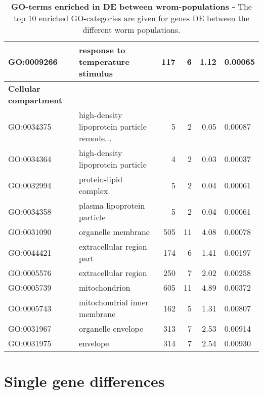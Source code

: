\begin{table}[ht]
\begin{center}
\begin{tabular}{llrrrl}
  GO:0009266 & response to temperature stimulus & 117 &   6 & 1.12 & 0.00065 \\ 
  \hline
  \textbf{Cellular compartment} &  &   &   &  &  \\  
  GO:0034375 & high-density lipoprotein particle remode... &   5 &   2 & 0.05 & 0.00087 \\ 
  GO:0034364 & high-density lipoprotein particle &   4 &   2 & 0.03 & 0.00037 \\ 
  GO:0032994 & protein-lipid complex &   5 &   2 & 0.04 & 0.00061 \\ 
  GO:0034358 & plasma lipoprotein particle &   5 &   2 & 0.04 & 0.00061 \\ 
  GO:0031090 & organelle membrane & 505 &  11 & 4.08 & 0.00078 \\ 
  GO:0044421 & extracellular region part & 174 &   6 & 1.41 & 0.00197 \\ 
  GO:0005576 & extracellular region & 250 &   7 & 2.02 & 0.00258 \\ 
  GO:0005739 & mitochondrion & 605 &  11 & 4.89 & 0.00372 \\ 
  GO:0005743 & mitochondrial inner membrane & 162 &   5 & 1.31 & 0.00807 \\ 
  GO:0031967 & organelle envelope & 313 &   7 & 2.53 & 0.00914 \\ 
  GO:0031975 & envelope & 314 &   7 & 2.54 & 0.00930 \\ 
   \hline
 \end{tabular}
 \caption[GO-terms enriched in DE between
 populations]{\textbf{GO-terms enriched in DE between wrom-populations
     -} The top 10 enriched GO-categories are given for genes DE
   between the different worm populations.}
\end{center}
\end{table}





\section{Single gene differences}
\label{sec:single-gene-diff}

